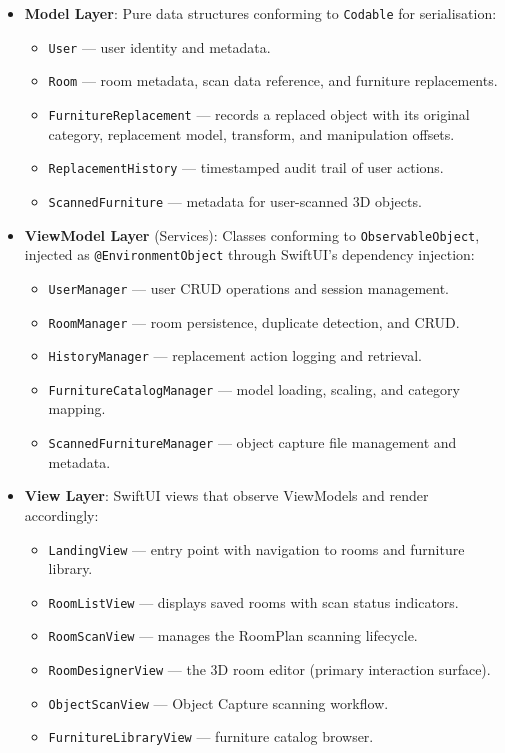 \begin{itemize}
    \item \textbf{Model Layer}: Pure data structures conforming to \texttt{Codable} for serialisation:
    \begin{itemize}
        \item \texttt{User} — user identity and metadata.
        \item \texttt{Room} — room metadata, scan data reference, and furniture replacements.
        \item \texttt{FurnitureReplacement} — records a replaced object with its original category, replacement model, transform, and manipulation offsets.
        \item \texttt{ReplacementHistory} — timestamped audit trail of user actions.
        \item \texttt{ScannedFurniture} — metadata for user-scanned 3D objects.
    \end{itemize}

    \item \textbf{ViewModel Layer} (Services): Classes conforming to \texttt{ObservableObject}, injected as \texttt{@EnvironmentObject} through SwiftUI's dependency injection:
    \begin{itemize}
        \item \texttt{UserManager} — user CRUD operations and session management.
        \item \texttt{RoomManager} — room persistence, duplicate detection, and CRUD.
        \item \texttt{HistoryManager} — replacement action logging and retrieval.
        \item \texttt{FurnitureCatalogManager} — model loading, scaling, and category mapping.
        \item \texttt{ScannedFurnitureManager} — object capture file management and metadata.
    \end{itemize}

    \item \textbf{View Layer}: SwiftUI views that observe ViewModels and render accordingly:
    \begin{itemize}
        \item \texttt{LandingView} — entry point with navigation to rooms and furniture library.
        \item \texttt{RoomListView} — displays saved rooms with scan status indicators.
        \item \texttt{RoomScanView} — manages the RoomPlan scanning lifecycle.
        \item \texttt{RoomDesignerView} — the 3D room editor (primary interaction surface).
        \item \texttt{ObjectScanView} — Object Capture scanning workflow.
        \item \texttt{FurnitureLibraryView} — furniture catalog browser.
    \end{itemize}
\end{itemize}

